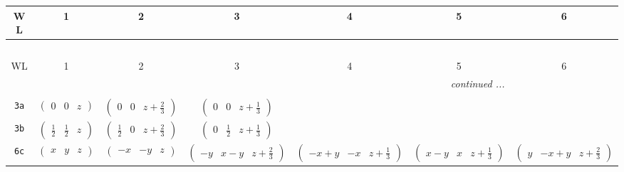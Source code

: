 \documentclass[fleqn,9pt,landscape]{jsarticle}
\begin{document}
\begin{center}
\renewcommand{\arraystretch}{1.2}
\begin{longtable}{ccccccc}
 \hline \hline
WL & 1 & 2 & 3 & 4 & 5 & 6 \\ \hline \endfirsthead

\multicolumn{6}{l}{\tablename\ \thetable{}} \\
 \hline \hline
WL & 1 & 2 & 3 & 4 & 5 & 6 \\ \hline \endhead

 \hline \hline
\multicolumn{6}{r}{\footnotesize\it continued ...} \\ \endfoot

 \hline \hline
\multicolumn{6}{r}{} \\ \endlastfoot

{\tt 3a} & $ \begin{pmatrix} 0 & 0 & z \end{pmatrix} $ & $ \begin{pmatrix} 0 & 0 & z + \frac{2}{3} \end{pmatrix} $ & $ \begin{pmatrix} 0 & 0 & z + \frac{1}{3} \end{pmatrix} $ & $  $ & $  $ & $  $ \\ \hline
{\tt 3b} & $ \begin{pmatrix} \frac{1}{2} & \frac{1}{2} & z \end{pmatrix} $ & $ \begin{pmatrix} \frac{1}{2} & 0 & z + \frac{2}{3} \end{pmatrix} $ & $ \begin{pmatrix} 0 & \frac{1}{2} & z + \frac{1}{3} \end{pmatrix} $ & $  $ & $  $ & $  $ \\ \hline
{\tt 6c} & $ \begin{pmatrix} x & y & z \end{pmatrix} $ & $ \begin{pmatrix} - x & - y & z \end{pmatrix} $ & $ \begin{pmatrix} - y & x - y & z + \frac{2}{3} \end{pmatrix} $ & $ \begin{pmatrix} - x + y & - x & z + \frac{1}{3} \end{pmatrix} $ & $ \begin{pmatrix} x - y & x & z + \frac{1}{3} \end{pmatrix} $ & $ \begin{pmatrix} y & - x + y & z + \frac{2}{3} \end{pmatrix} $ \\
\end{longtable}
\end{center}
\end{document}

